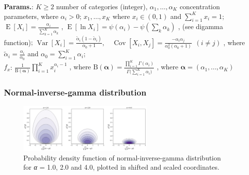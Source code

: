     {\color{darkblue} \textbf{Params.}:} {$K \geq 2$ number of categories (integer),  $\alpha_1, \ldots, \alpha_K$ concentration parameters, where $\alpha_i > 0$}; {$x_1, \ldots, x_K$ where $x_i \in (0,1)$ and $\sum_{i=1}^K x_i = 1$}; {$\operatorname{E}[X_i] = \frac{\alpha_i}{\sum_{k=1}^K \alpha_k}$ ,  $ \operatorname{E}[\ln X_i] = \psi(\alpha_i)-\psi(\textstyle\sum_k \alpha_k)$ , (see digamma function)}; {$\operatorname{Var}[X_i] = \frac{\tilde{\alpha}_i(1-\tilde{\alpha}_i)}{\alpha_0+1}, \quad \operatorname{Cov}[X_i,X_j] = \frac{-\alpha_i \alpha_j}{\alpha_{0}^{2}(\alpha_0+1)}~~(i\neq j)$ , where $\tilde{\alpha}_i = \frac{\alpha_i}{\alpha_0}$ and $\alpha_0 = \sum_{i=1}^K\alpha_i$};\hspace{0.5cm}\\{\color{darkblue} \textbf{$f_x$}:} {$\frac{1}{\mathrm{B}(\boldsymbol\alpha)} \prod_{i=1}^K x_i^{\alpha_i - 1} $ , where $\mathrm{B}(\boldsymbol\alpha) = \frac{\prod_{i=1}^K \Gamma(\alpha_i)}{\Gamma\bigl(\sum_{i=1}^K \alpha_i\bigr)}$ , where $\boldsymbol\alpha=(\alpha_1,\ldots,\alpha_K)$}



    
        
\subsubsection{Normal-inverse-gamma distribution}


    \begin{figure}[H]
        \centering
        \includegraphics[width=0.6\textwidth]{images/Normal-inverse-gamma.png}
        \caption{Probability density function of normal-inverse-gamma distribution for \textit{α} = 1.0, 2.0 and 4.0, plotted in shifted and scaled coordinates.}
    \end{figure}




